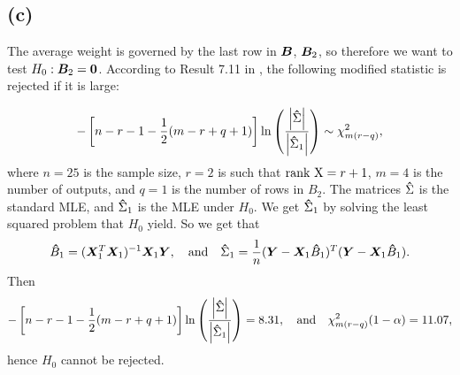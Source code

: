 \subsection*{(c)}
\label{sec:c-5}

The average weight is governed by the last row in $\bm{B}$, $\bm{B}_{2}$, so therefore we
want to test $H_{0}: \bm{B}_{2} = \bm{0}$. According to Result 7.11 in
\cite[p. 396]{book}, the  following modified statistic is rejected if it
is large:

\begin{equation*}
  -\left[n - r- 1 - \frac{1}{2}(m-r+q+1)\right]\ln
  \left(
    \frac{\left| \bm{\hat}\Sigma \right|}{\left| \bm{\hat}\Sigma_{1} \right|}
  \right) \sim \chi^{2}_{m(r-q)},
\end{equation*}
where $n= 25$ is the sample size, $r=2$ is such that $\text{rank X} = r + 1$,
$m=4$ is the number of outputs, and $q=1$ is the number of rows in
$B_{2}$. The matrices $\bm{\hat} \Sigma$ is the standard MLE, and
$\bm{\hat}\Sigma_{1}$ is the MLE under $H_{0}$. We get $\bm{\hat}\Sigma_{1}$
by solving the least squared problem that $H_{0}$ yield. So we get that
\begin{equation*}
  \bm{\hat} B_{1} = (\bm{X}_{1}^{T} \bm{X}_{1})^{-1}\bm{X}_{1} \bm{Y}, \quad
  \text{and} \quad 
  \bm{\hat}\Sigma_{1} = \frac{1}{n} (\bm{Y}  - \bm{X}_{1} \bm{\hat} B_{1})^{T}(\bm{Y}  - \bm{X}_{1} \bm{\hat} B_{1}).
\end{equation*}
Then
\begin{equation*}
    -\left[n - r- 1 - \frac{1}{2}(m-r+q+1)\right]\ln
  \left(
    \frac{\left| \bm{\hat}\Sigma \right|}{\left| \bm{\hat}\Sigma_{1} \right|}
  \right) =8.31, \quad \text{and}\quad \chi^{2}_{m(r-q)}(1 - \alpha) = 11.07,
\end{equation*}
hence $H_{0}$ cannot be rejected. 

